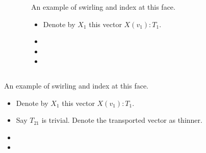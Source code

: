 \begin{frame}
\begin{columns}
\begin{column}{0.65\textwidth}
\vspace{12pt}
\begingroup
{}

\endgroup
\end{column}
\begin{column}{0.35\textwidth}
An example of \alert{swirling} and \alert{index} at this face.
\begin{itemize}
\item<1-> Denote by \( X_1 \) this vector \( X(v_1):T_1 \).
\item<1-> 
\item<1-> 
\item<1-> 
\end{itemize}
\end{column}
\end{columns}
\end{frame}

\begin{frame}
\begin{columns}
\begin{column}{0.65\textwidth}
\vspace{12pt}
\begingroup
{}

\endgroup
\end{column}
\begin{column}{0.35\textwidth}
An example of \alert{swirling} and \alert{index} at this face.
\begin{itemize}
\item<1-> Denote by \( X_1 \) this vector \( X(v_1):T_1 \).
\item<1-> Say \( T_{21} \) is trivial. Denote the transported vector as thinner.
\item<1-> 
\item<1-> 
\end{itemize}
\end{column}
\end{columns}
\end{frame}

